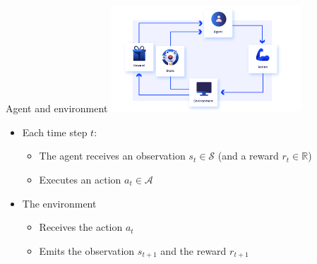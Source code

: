 \documentclass[presentation, 9pt]{beamer}\mode<presentation>{\usetheme{AMSBolognaFC}}
\begin{document}
\begin{frame}{Agent and environment}
\centering
\includegraphics[height=4cm]{img/interaction-loop.png}
\begin{itemize}
	\item Each time step $t$:
	\begin{itemize}
		\item The agent receives an observation $s_t \in \mathcal{S}$ (and a reward $r_t \in \mathbb{R}$)
		\item Executes an action $a_t \in \mathcal{A}$
	\end{itemize}
	\item The environment 
	\begin{itemize}
		\item Receives the action $a_t$
		\item Emits the observation $s_{t+1}$ and the reward $r_{t+1}$
	\end{itemize}
\end{itemize}
\end{frame}
\end{document}
